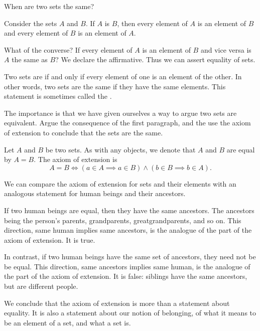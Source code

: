 

When are two
sets the same?


Consider the sets
$A$ and $B$.
If $A$ is $B$,
then every element of
$A$ is an element of
$B$ and every element
of $B$ is an element of
$A$.

What of the converse?
If every element of $A$
is an element of $B$
and vice versa is $A$
the same as $B$?
We declare the affirmative.
Thus we can assert equality
of sets.

Two sets are
if and only
if every element of one
is an element of the other.
In other words, two sets are
the same if they have the same
elements.
This statement
is sometimes called the
.

The importance is that we have
given ourselves a way to argue
two sets are equivalent. Argue
the consequence of the first
paragraph, and the use the
axiom of extension to conclude
that the sets are the same.


Let $A$ and $B$ be
two sets.
As with any objects,
we denote that
$A$ and $B$
are equal
by $A = B$.
The axiom of extension is
\[
  A = B \Leftrightarrow (a \in A \implies a \in B) \land (b \in B \implies b \in A).
\]


We can compare the axiom of extension
for sets and their elements with an
analogous statement
for human beings and their ancestors.

If two human beings are equal,
then they have the same ancestors.
The ancestors being the person's parents,
grandparents, greatgrandparents,
and so on.
This direction, same human implies
same ancestors, is the analogue of
the  part of the axiom
of extension.
It is true.

In contrast, if two human beings have
the same set of ancestors, they need not be
be equal.
This direction, same ancestors implies
same human, is the analogue of the
 part of the axiom
of extension.
It is false:
siblings have the same ancestors,
but are different people.

We conclude that the axiom of extension
is more than a statement about equality.
It is also a statement about our notion of
belonging, of what it means
to be an element of a set, and what a set is.
